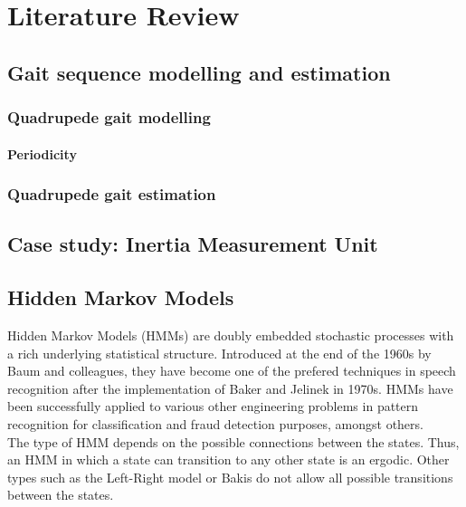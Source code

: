 \chapter{Literature Review}
\section{Gait sequence modelling and estimation}
\subsection{Quadrupede gait modelling}
\subsubsection{Periodicity}
\subsection{Quadrupede gait estimation}
\section{Case study: Inertia Measurement Unit}
\section{Hidden Markov Models}
Hidden Markov Models (HMMs) are doubly embedded stochastic processes with a rich underlying statistical structure. Introduced at the end of the 1960s by Baum and colleagues, they have become one of the prefered techniques in speech recognition after the implementation of Baker and Jelinek in 1970s. HMMs have been successfully applied to various other engineering problems in pattern recognition for classification and fraud detection purposes, amongst others.\\
The type of HMM depends on the possible connections between the states. Thus, an HMM in which a state can transition to any other state is an ergodic. Other types such as the Left-Right model or Bakis do not allow all possible transitions between the states.
